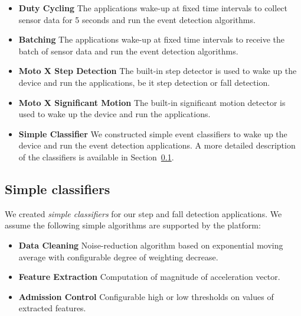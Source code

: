 \begin{itemize}

\item {\bf Duty Cycling} The applications wake-up at fixed time intervals to collect sensor data for 5 seconds and run the event detection algorithms.

\item {\bf Batching} The applications wake-up at fixed time intervals to receive the batch of sensor data and run the event detection algorithms.

\item {\bf Moto X Step Detection} The built-in step detector is used to wake up the device and run the applications, be it step detection or fall detection.

\item {\bf Moto X Significant Motion} The built-in significant motion detector is used to wake up the device and run the applications.

\item {\bf Simple Classifier} We constructed simple event classifiers to wake up the device and run the event detection applications. A more detailed description of the 
  classifiers is available in Section~\ref{sec:classifiers}.
  
\end{itemize}

\subsection{Simple classifiers}
\label{sec:classifiers}

We created {\em simple classifiers} for our step and fall detection applications. We assume the
following simple algorithms are supported by the platform:

\begin{itemize}

\item {\bf Data Cleaning} Noise-reduction algorithm based on exponential moving average with 
  configurable degree of weighting decrease.

\item {\bf Feature Extraction} Computation of magnitude of acceleration vector.

\item {\bf Admission Control} Configurable high or low thresholds on values of extracted features.
  
\end{itemize}

